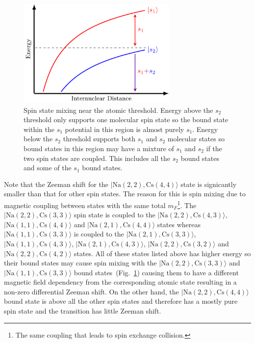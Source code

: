 \begin{figure}
  \centering
  \includegraphics[width=0.7\textwidth]{figures/raman_spectroscopy_spin_mixing.pdf}
  \caption[Spin state mixing near the atomic threshold.]{
    Spin state mixing near the atomic threshold.
    Energy above the $s_2$ threshold only supports one molecular spin state
    so the bound state within the $s_1$ potential in this region is
    almost purely $s_1$.
    Energy below the $s_2$ threshold supports both $s_1$ and $s_2$ molecular states
    so bound states in this region may have a mixture of $s_1$ and $s_2$
    if the two spin states are coupled.
    This includes all the $s_2$ bound states and some of the $s_1$ bound states.
    \label{fig:raman-spectroscopy:spin-mixing}}
\end{figure}

Note that the Zeeman shift for the $|\mathrm{Na(2, 2),Cs(4, 4)}\rangle$ state
is signicantly smaller than that for other spin states.
The reason for this is spin mixing due to magnetic coupling between states
with the same total $m_F$\footnote{The same coupling that leads to spin exchange collision.}.
The $|\mathrm{Na(2, 2),Cs(3, 3)}\rangle$ spin state is coupled to the
$|\mathrm{Na(2, 2),Cs(4, 3)}\rangle$, $|\mathrm{Na(1, 1),Cs(4, 4)}\rangle$
and $|\mathrm{Na(2, 1),Cs(4, 4)}\rangle$ states
whereas $|\mathrm{Na(1, 1),Cs(3, 3)}\rangle$ is coupled to the
$|\mathrm{Na(2, 1),Cs(3, 3)}\rangle$, $|\mathrm{Na(1, 1),Cs(4, 3)}\rangle$,
$|\mathrm{Na(2, 1),Cs(4, 3)}\rangle$, $|\mathrm{Na(2, 2),Cs(3, 2)}\rangle$
and $|\mathrm{Na(2, 2),Cs(4, 2)}\rangle$ states.
All of these states listed above has higher energy so their bound states
may cause spin mixing with the $|\mathrm{Na(2, 2),Cs(3, 3)}\rangle$ and
$|\mathrm{Na(1, 1),Cs(3, 3)}\rangle$ bound states~(Fig.~\ref{fig:raman-spectroscopy:spin-mixing})
causing them to have a different magnetic field dependency from the corresponding atomic state
resulting in a non-zero differential Zeeman shift.
On the other hand, the $|\mathrm{Na(2, 2),Cs(4, 4)}\rangle$ bound state is above
all the other spin states and therefore has a mostly pure spin state
and the transition has little Zeeman shift.

